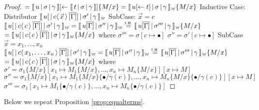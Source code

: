 \documentclass[a4paper,UKenglish,cleveref, autoref]{lipics-v2019}
\newcommand{\share}[3]{#1 [#2 \leftarrow #3]}
\newcommand{\dist}[5]{#1 [ #2 \, \vert \, \fakedist{#4}{#5} \, #3 ]}
\newcommand{\fakedist}[2]{#1 \langle \, #2 \, \rangle}
\newcommand{\sub}[3]{#1 \{ #2 / #3 \}}
\newcommand{\weaksymbol}{\mbox{\tiny $\mathcal{W}$}}
\newcommand{\readbackwmap}[3]{\llbracket \, #1 \, \vert \, #2 \, \vert \, #3  \, \rrbracket }
\newcommand{\readweakwmap}[3]{\llbracket \, #1 \, \vert \, #2 \, \vert \, #3  \, \rrbracket_{\weaksymbol} }
\newcommand{\IH}{\stackrel{\hbox{\tiny I.H.}}{\hbox{=}}}
\begin{document}
\begin{proof}
\newline
$= \share{\readbackwmap{u}{\sigma}{\gamma}}{}{\readbackwmap{t}{\sigma}{\gamma}}  \sub{}{M}{x} = \readweakwmap{\share{u}{}{t}}{\sigma}{\gamma} \sub{}{M}{x}$
\newline
\newline
Inductive Case: Distributor
\newline
$\readweakwmap{\dist{u}{}{\overline{[\Gamma]}}{c}{\vec{x}}}{\sigma'}{\gamma}$
\newline
\newline
\indent SubCase: $\vec{x} = c$
\newline
$\readweakwmap{\dist{u}{}{\overline{[\Gamma]}}{c}{c}}{\sigma'}{\gamma} = \readweakwmap{u \overline{[\Gamma]}}{\sigma''}{\gamma} \IH \readweakwmap{u \overline{[\Gamma]}}{\sigma'''}{\gamma} \sub{}{M}{x}$
\newline
$ = \readweakwmap{\dist{u}{}{\overline{[\Gamma]}}{c}{c}}{\sigma}{\gamma}  \sub{}{M}{x}$
\newline
where
\newline
$\sigma''' = \sigma [c \mapsto \bullet]$
\newline
$\sigma'' = \sigma' [c \mapsto \bullet]$
\newline
\newline
\indent SubCase $\vec{x} = x_{1}, \dots, x_{n}$
\newline
$\readweakwmap{\dist{u}{}{\overline{[\Gamma]}}{c}{x_{1}, \dots, x_{n}}}{\sigma'}{\gamma} = \readweakwmap{u \overline{[\Gamma]}}{\sigma''}{\gamma} \IH \readweakwmap{u \overline{[\Gamma]}}{\sigma'''}{\gamma} \sub{}{M}{x}$
\newline
$ = \readweakwmap{\dist{u}{}{\overline{[\Gamma]}}{c}{c}}{\sigma}{\gamma}  \sub{}{M}{x}$
\newline
where
\newline
$\sigma' = \sigma_{1}\sub{}{M}{x} [x_{1} \mapsto M_{1}\sub{}{M}{x}, \dots, x_{n} \mapsto M_{n}\sub{}{M}{x}] [x \mapsto M]$
\newline
$\sigma'' = \sigma_{1}\sub{}{M}{x} [x_{1} \mapsto M_{1}\sub{}{M}{x} \sub{}{\bullet}{\gamma(c)}, \dots, x_{n} \mapsto M_{n} \sub{}{M}{x} \sub{}{\bullet}{\gamma(c)}] [x \mapsto M]$
\newline
$\sigma''' = \sigma_{1} [x_{1} \mapsto M_{1} \sub{}{\bullet}{\gamma(c)}, \dots, x_{n} \mapsto M_{n} \sub{}{\bullet}{\gamma(c)}]$
\end{proof}

Below we repeat Proposition \ref{prop:equalterms}.
\end{document}
